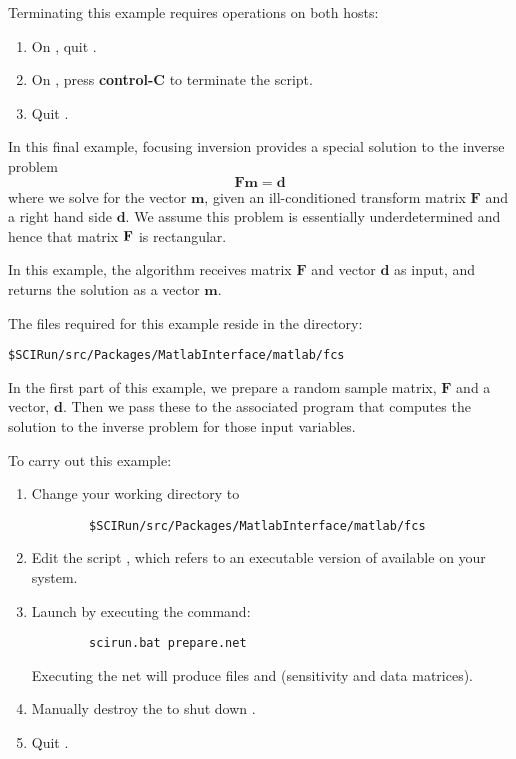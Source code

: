 Terminating this example requires operations on both hosts:
%
\begin{enumerate} 
  \item On , quit \sr{}.  
  \item On , press {\bf control-C} to terminate the
         script.
  \item Quit \m{}.
\end{enumerate}



In this final example, focusing inversion provides a special solution to
the inverse problem
%
\begin{equation}
  \mathbf{F} \mathbf{m} = \mathbf{d} 
\end{equation}
%
where we solve for the vector $\mathbf{m}$, given an ill-conditioned
transform matrix $\mathbf{F}$ and a right hand side $\mathbf{d}$.  We
assume this problem is essentially underdetermined and hence that matrix
${\bf F}$ is rectangular.

In this example, the algorithm receives matrix $\mathbf{F}$ and vector
$\mathbf{d}$ as input, and returns the solution as a vector $\mathbf{m}$.

The files required for this example reside in the directory:
%
\begin{verbatim}
$SCIRun/src/Packages/MatlabInterface/matlab/fcs
\end{verbatim}

In the first part of this example, we prepare a random sample matrix,
$\mathbf{F}$ and a vector, $\mathbf{d}$.  Then we pass these to the
associated \m{} program that computes the solution to the inverse
problem for those input variables.

To carry out this example:
%
\begin{enumerate}
  \item Change your working directory to
        \begin{verbatim}
        $SCIRun/src/Packages/MatlabInterface/matlab/fcs
        \end{verbatim}  
  \item Edit the script , which refers to an
        executable version of \sr{} available on your system.
  \item Launch \sr{} by executing the command:\\
        \begin{verbatim}
        scirun.bat prepare.net
        \end{verbatim} 
        Executing the net will produce files  
        and  (sensitivity and data matrices).
  \item Manually destroy the \mlm{} to shut down \m{}.
  \item Quit \sr{}.
\end{enumerate}

